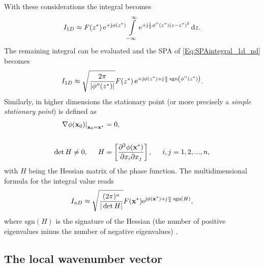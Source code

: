 With these considerations the integral becomes
\begin{align}
I_{1D} \approx F(z^*)\,\mathrm{e}^{+\mathrm{j}\phi(z^*)} 
\int\limits_{-\infty}^{\infty} \mathrm{e}^{+\mathrm{j} \frac{1}{2}\phi''(z^*)(z-z^*)^2} \, \mathrm{d} z.
\end{align}
The remaining integral can be evaluated and the SPA of \eqref{Eq:SPAintegral_1d_nd} becomes \cite[Ch.\ 2.8]{Blenstein1975}
\begin{equation}
\label{Eq:SPAResult}
I_{1D} \approx \sqrt{\frac{2\pi}{| \phi''(z^*) |}} F(z^*) \, \mathrm{e}^{+\mathrm{j} \phi(z^*) + \mathrm{j} \frac{\pi}{4}\,\mathrm{sgn}\left(  \phi''(z^*) \right)}.
\end{equation}
\vspace{3mm}
Similarly, in higher dimensions the stationary point (or more precisely a \emph{simple stationary point}) is defined as
\begin{align}
\label{Eq:ndim_stat_point}
\begin{split}
\left.
\nabla \phi(\vxo)\right|_{\vxo = \vx^*} &= 0,
\\ \vspace{3mm} \\
\det H \neq 0,
\hspace{5mm} 
H &= \left[
\frac{\partial^2 \phi(\vx^*)}{\partial x_i \partial x_j} 
\right],
\hspace{5mm}
i,j = 1,2,...,n,
\end{split}
\end{align}
with $H$ being the Hessian matrix of the phase function.
The multidimensional formula for the integral value reads
\begin{equation}
\label{Eq:SPAResult_nd}
I_{nD} \approx \sqrt{\frac{(2\pi)^n}{|\det H|}} F(\mathbf{x}^*) \mathrm{e}^{\mathrm{j} \phi(\mathbf{x}^*) + \mathrm{j} \frac{\pi}{4}\,\mathrm{sgn}\left( H \right)},
\end{equation}
where $\mathrm{sgn}\left( H \right)$ is the signature of the Hessian (the number of positive eigenvalues minus the number of negative eigenvalues) \cite{Bleistein2000}.


\subsection{The local wavenumber vector}

